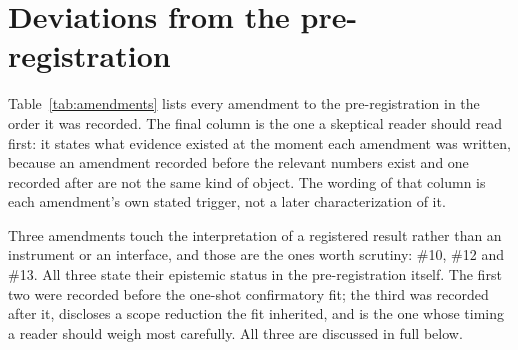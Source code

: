 %

\section{Deviations from the pre-registration}
\label{app:deviations}

Table~\ref{tab:amendments} lists every amendment to the pre-registration in the
order it was recorded. The final column is the one a skeptical reader should
read first: it states what evidence existed at the moment each amendment was
written, because an amendment recorded before the relevant numbers exist and one
recorded after are not the same kind of object. The wording of that column is
each amendment's own stated trigger, not a later characterization of it.

Three amendments touch the interpretation of a registered result rather than an
instrument or an interface, and those are the ones worth scrutiny: \#10, \#12
and \#13. All three state their epistemic status in the pre-registration
itself. The first two were recorded before the one-shot confirmatory fit; the
third was recorded after it, discloses a scope reduction the fit inherited, and
is the one whose timing a reader should weigh most carefully. All three are
discussed in full below.

